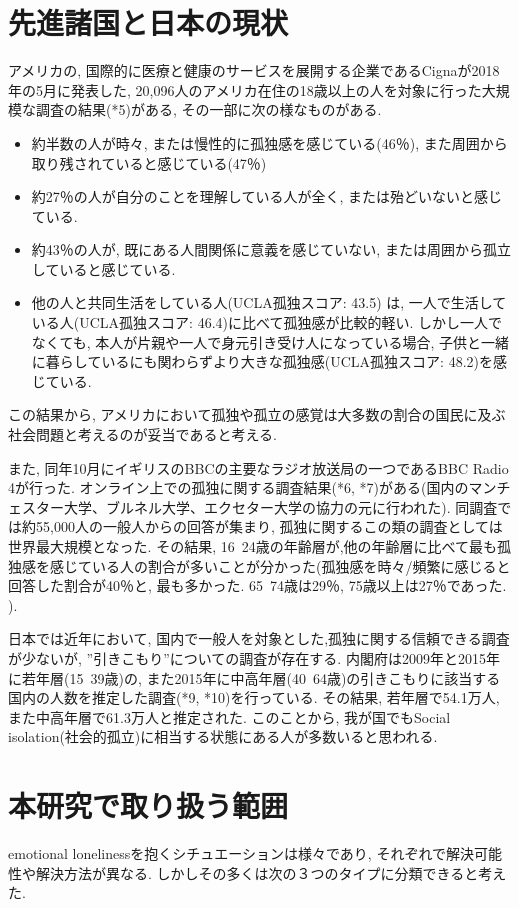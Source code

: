 \documentclass[a4paper,dvipdfmx]{hisken}
\begin{document}
\section{先進諸国と日本の現状}
アメリカの, 国際的に医療と健康のサービスを展開する企業であるCignaが2018年の5月に発表した, 20,096人のアメリカ在住の18歳以上の人を対象に行った大規模な調査の結果(*5)がある, その一部に次の様なものがある. 
\begin{itemize}
\item 約半数の人が時々, または慢性的に孤独感を感じている(46％), また周囲から取り残されていると感じている(47％)
\item 約27％の人が自分のことを理解している人が全く, または殆どいないと感じている. 
\item 約43％の人が, 既にある人間関係に意義を感じていない, または周囲から孤立していると感じている. 
\item 他の人と共同生活をしている人(UCLA孤独スコア: 43.5) は, 一人で生活している人(UCLA孤独スコア: 46.4)に比べて孤独感が比較的軽い. しかし一人でなくても, 本人が片親や一人で身元引き受け人になっている場合, 子供と一緒に暮らしているにも関わらずより大きな孤独感(UCLA孤独スコア: 48.2)を感じている. 
\end{itemize}

この結果から, アメリカにおいて孤独や孤立の感覚は大多数の割合の国民に及ぶ社会問題と考えるのが妥当であると考える.

また, 同年10月にイギリスのBBCの主要なラジオ放送局の一つであるBBC Radio 4が行った. オンライン上での孤独に関する調査結果(*6, *7)がある(国内のマンチェスター大学、ブルネル大学、エクセター大学の協力の元に行われた). 同調査では約55,000人の一般人からの回答が集まり, 孤独に関するこの類の調査としては世界最大規模となった. 
その結果, 16~24歳の年齢層が,他の年齢層に比べて最も孤独感を感じている人の割合が多いことが分かった(孤独感を時々/頻繁に感じると回答した割合が40％と, 最も多かった. 65~74歳は29％, 75歳以上は27％であった. ). 

日本では近年において, 国内で一般人を対象とした,孤独に関する信頼できる調査が少ないが, ”引きこもり”についての調査が存在する. 
内閣府は2009年と2015年に若年層(15~39歳)の, また2015年に中高年層(40~64歳)の引きこもりに該当する国内の人数を推定した調査(*9, *10)を行っている. その結果, 若年層で54.1万人, また中高年層で61.3万人と推定された.
このことから, 我が国でもSocial isolation(社会的孤立)に相当する状態にある人が多数いると思われる.


\section{本研究で取り扱う範囲}
emotional lonelinessを抱くシチュエーションは様々であり, それぞれで解決可能性や解決方法が異なる. しかしその多くは次の３つのタイプに分類できると考えた.
\end{document}
